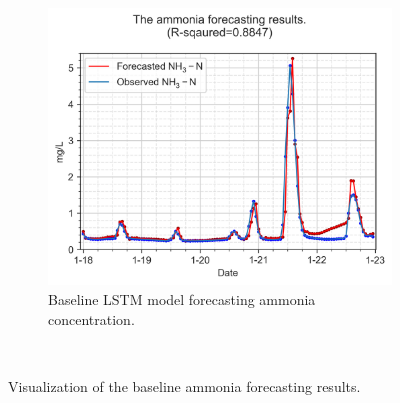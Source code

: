 \begin{figure}[!ht]
\begin{subfigure}[t]{0.75\textwidth}
      \includegraphics[width=\linewidth]{imgs/results/ammonia-colour-forecast-plot/00-LSTM_1_pred_Step1-obs-nh3.png}
      \caption{Baseline LSTM model forecasting ammonia concentration.} \label{fig:baseline-nh3-plot-lstm}
    \end{subfigure}\\
  \caption{Visualization of the baseline ammonia forecasting results.} \label{fig:baseline-plot-ammonia}
\end{figure}


